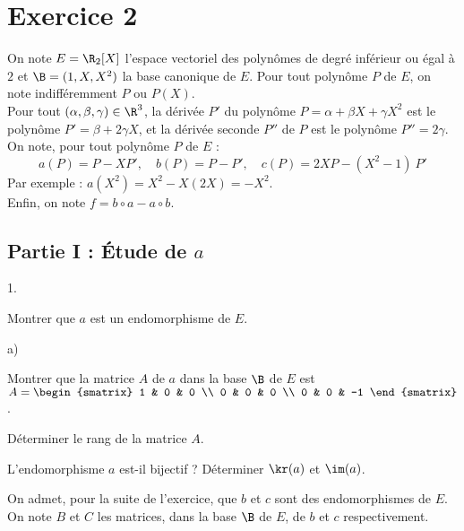 

\section*{Exercice 2}

\noindent
On note $E = \R_2[X]$ l'espace vectoriel des polynômes de degré
inférieur ou égal à $2$ et $\B = (1,X,X^2)$ la base canonique de $E$.
Pour tout polynôme $P$ de $E$, on note indifféremment $P$ ou $P(X)$.\\
Pour tout $(\alpha,\beta,\gamma)\in\R^3$, la dérivée $P'$ du polynôme
$P=\alpha+\beta X+\gamma X^2$ est le polynôme $P' = \beta+2\gamma X$,
et la dérivée seconde $P''$ de $P$ est le polynôme $P'' = 2\gamma$.\\
On note, pour tout polynôme $P$ de $E$ :
\[
a(P) = P-XP', \quad b(P) = P-P', \quad c(P) = 2XP-(X^2-1) \ P'
\]
Par exemple : $a(X^2) = X^2-X(2X) = -X^2$.\\
Enfin, on note $f = b\circ a - a \circ b$.




\subsection*{Partie I : Étude de $a$}

\begin{noliste}{1.}
  \setlength{\itemsep}{2mm}
\item Montrer que $a$ est un endomorphisme de $E$.
  
  




\item
  \begin{noliste}{a)}
  \item Montrer que la matrice $A$ de $a$ dans la base $\B$ de $E$ est
    $A = 
    \begin{smatrix} 
      1 & 0 & 0 \\ 
      0 & 0 & 0 \\ 
      0 & 0 & -1
    \end{smatrix}$.
    
    
    
  \item Déterminer le rang de la matrice $A$.
    
    
  \end{noliste}
  
\item L'endomorphisme $a$ est-il bijectif ? Déterminer $\kr(a)$ et
  $\im(a)$.

  
  On admet, pour la suite de l'exercice, que $b$ et $c$ sont des
  endomorphismes de $E$.\\
  On note $B$ et $C$ les matrices, dans la base $\B$ de $E$, de $b$ et
  $c$ respectivement.
\end{noliste}


